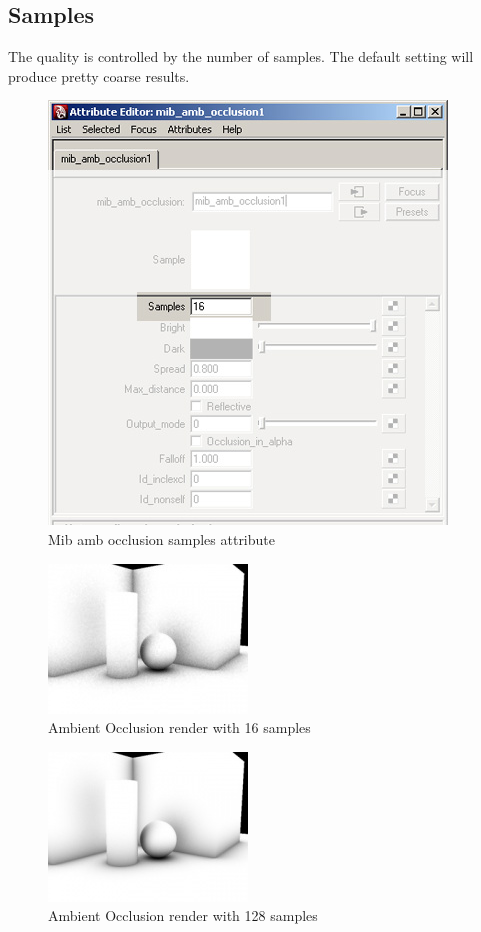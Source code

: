 \documentclass[10pt,a4paper]{article}
\begin{document}
\subsection{Samples}
The quality is controlled by the number of samples. The default setting will produce pretty coarse results.

\begin{figure}[tbh]
\centering
\includegraphics[width=0.5\linewidth]{figure/Mib_amb_occlusion_samples_attribute}
\caption{Mib amb occlusion samples attribute}
\label{fig:mibambocclusionsamplesattribute}
\end{figure}

\begin{figure}[tbh]
\centering
\includegraphics[width=0.5\linewidth]{figure/Amb_occlusion_example_16samples}
\caption{Ambient Occlusion render with 16 samples}
\label{fig:ambocclusionexample16samples}
\end{figure}

\begin{figure}[tbh]
\centering
\includegraphics[width=0.5\linewidth]{figure/Amb_occlusion_example_128samples}
\caption{Ambient Occlusion render with 128 samples}
\label{fig:ambocclusionexample128samples}
\end{figure}
\end{document}
